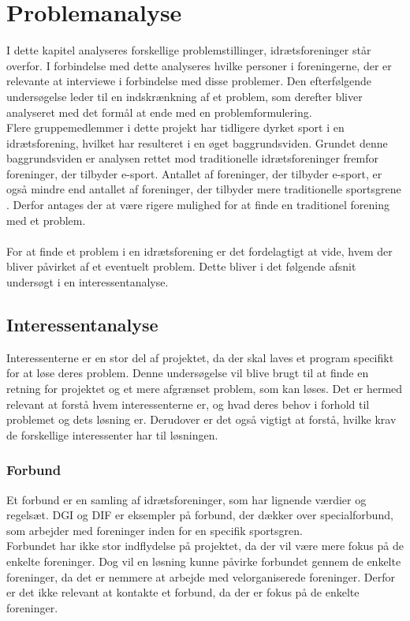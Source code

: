 \chapter{Problemanalyse}\label{ch:ch2label}
I dette kapitel analyseres forskellige problemstillinger, idrætsforeninger står overfor. I forbindelse med dette analyseres hvilke personer i foreningerne, der er relevante at interviewe i forbindelse med disse problemer. Den efterfølgende undersøgelse leder til en indskrænkning af et problem, som derefter bliver analyseret med det formål at ende med en problemformulering. \\
Flere gruppemedlemmer i dette projekt har tidligere dyrket sport i en idrætsforening, hvilket har resulteret i en øget baggrundsviden. Grundet denne baggrundsviden er analysen rettet mod traditionelle idrætsforeninger fremfor foreninger, der tilbyder e-sport. Antallet af foreninger, der tilbyder e-sport, er også mindre end antallet af foreninger, der tilbyder mere traditionelle sportsgrene \citep{e-sport}. Derfor antages der at være rigere mulighed for at finde en traditionel forening med et problem.
\\\\
For at finde et problem i en idrætsforening er det fordelagtigt at vide, hvem der bliver påvirket af et eventuelt problem. Dette bliver i det følgende afsnit undersøgt i en interessentanalyse. 
\newpage
\section{Interessentanalyse}
Interessenterne er en stor del af projektet, da der skal laves et program specifikt for at løse deres problem. Denne undersøgelse vil blive brugt til at finde en retning for projektet og et mere afgrænset problem, som kan løses. Det er hermed relevant at forstå hvem interessenterne er, og hvad deres behov i forhold til problemet og dets løsning er. Derudover er det også vigtigt at forstå, hvilke krav de forskellige interessenter har til løsningen.

\subsection*{Forbund}
Et forbund er en samling af idrætsforeninger, som har lignende værdier og regelsæt. DGI og DIF er eksempler på forbund, der dækker over specialforbund, som arbejder med foreninger inden for en specifik sportsgren.\\
Forbundet har ikke stor indflydelse på projektet, da der vil være mere fokus på de enkelte foreninger. Dog vil en løsning kunne påvirke forbundet gennem de enkelte foreninger, da det er nemmere at arbejde med velorganiserede foreninger. Derfor er det ikke relevant at kontakte et forbund, da der er fokus på de enkelte foreninger. 

